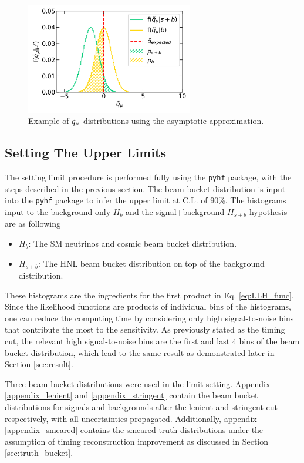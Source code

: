 \begin{figure}[hp!] 
\centering    
\includegraphics[width=0.65\textwidth]{asymtotic}
\caption[stat asymptotic]{Example of $\Tilde{q}_\mu$ distributions using the asymptotic approximation.}
\label{fig:stat_asymptotic}
\end{figure}

\subsection{Setting The Upper Limits}
\label{sec:set_limits}

The setting limit procedure is performed fully using the \texttt{pyhf} package, with the steps described in the previous section.
The beam bucket distribution is input into the \texttt{pyhf} package to infer the upper limit at C.L. of 90\%.
The histograms input to the background-only $H_{b}$ and the signal+background $H_{s+b}$ hypothesis are as following
\begin{itemize}
    \item $H_b$: The SM neutrinos and cosmic beam bucket distribution.
    \item $H_{s+b}$: The HNL beam bucket distribution on top of the background distribution. 
\end{itemize}

These histograms are the ingredients for the first product in Eq. \ref{eq:LLH_func}.
Since the likelihood functions are products of individual bins of the histograms, one can reduce the computing time by considering only high signal-to-noise bins that contribute the most to the sensitivity. 
As previously stated as the timing cut, the relevant high signal-to-noise bins are the first and last 4 bins of the beam bucket distribution, which lead to the same result as demonstrated later in Section \ref{sec:result}.

Three beam bucket distributions were used in the limit setting.
Appendix \ref{appendix_lenient} and \ref{appendix_stringent} contain the beam bucket distributions for signals and backgrounds after the lenient and stringent cut respectively, with all uncertainties propagated.
Additionally, appendix \ref{appendix_smeared} contains the smeared truth distributions under the assumption of timing reconstruction improvement as discussed in Section \ref{sec:truth_bucket}.

